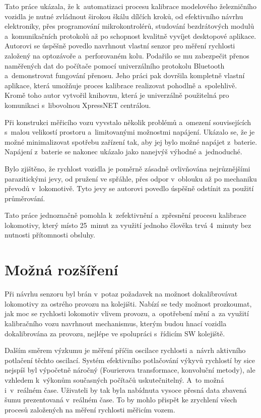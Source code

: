 Tato práce ukázala, že k~automatizaci procesu kalibrace modelového železničního
vozidla je nutné zvládnout širokou škálu dílčích kroků, od efektivního návrhu
elektroniky, přes programování mikrokontrolérů, studování bezdrátových modulů
a~komunikačních protokolů až po schopnost kvalitně vyvíjet desktopové aplikace.
Autorovi se úspěšně povedlo navrhnout vlastní senzor pro měření rychlosti
založený na optozávoře a~perforovaném kolu. Podařilo se mu zabezpečit přenos
naměřených dat do počítače pomocí univerzálního protokolu Bluetooth
a~demonstrovat fungování přenosu. Jeho práci pak dovršila kompletně vlastní
aplikace, která umožňuje proces kalibrace realizovat pohodlně a~spolehlivě.
Kromě toho autor vytvořil knihovnu, která je univerzálně použitelná pro
komunikaci s~libovolnou XpressNET centrálou.

Při konstrukci měřicího vozu vyvstalo několik problémů a~omezení souvisejících
s~malou velikostí prostoru a~limitovanými možnostmi napájení. Ukázalo se, že je
možné minimalizovat spotřebu zařízení tak, aby jej bylo možné napájet
z~baterie.  Napájení z~baterie se nakonec ukázalo jako nanejvýš výhodné
a~jednoduché.

Bylo zjištěno, že rychlost vozidla je poměrně zásadně ovlivňována nejrůznějšími
parazitickými jevy, od pružení ve spřáhle, přes odpor v~oblouku až po mechaniku
převodů v~lokomotivě. Tyto jevy se autorovi povedlo úspěšně odstínit za použití
průměrování.

Tato práce jednoznačně pomohla k~zefektivnění a~zpřesnění procesu kalibrace
lokomotivy, který místo 25~minut za využití jednoho člověka trvá 4~minuty
bez nutnosti přítomnosti obsluhy.

\section{Možná rozšíření}

Při návrhu senzoru byl brán v~potaz požadavek na možnost dokalibrovávat
lokomotivy za ostrého provozu na kolejišti. Nabízí se tedy možnost prozkoumat,
jak moc se rychlosti lokomotiv vlivem provozu, a~opotřebení mění a~za využití
kalibračního vozu navrhnout mechanismus, kterým budou hnací vozidla
dokalibrována za provozu, nejlépe ve spolupráci s~řídicím SW kolejiště.

Dalším směrem výzkumu je měření příčin oscilace rychlosti a~návrh
aktivního potlačení těchto oscilací. Systém efektivního potlačování výkyvů
rychlostí by sice nejspíš byl výpočetně náročný (Fourierova transformace,
konvoluční metody), ale vzhledem k~výkonům současných počítačů uskutečnitelný.
A~to možná i~v~reálném čase. Uživateli by tak byla nabídnuta vysoce přesná data
zbavená šumu prezentovaná v~reálném čase. To by mohlo přispět ke zrychlení
všech procesů založených na měření rychlosti měřicím vozem.
